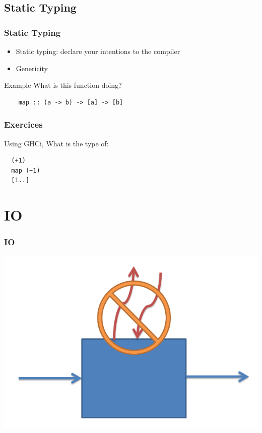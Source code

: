 \documentclass{beamer}
\begin{document}
\subsection{Static Typing}
\begin{frame}[fragile]
\frametitle{Static Typing}

 \begin{itemize}
  \item Static typing: declare your intentions to the compiler
  \item Genericity
 \end{itemize}
 
 \begin{block}{Example}
  What is this function doing?
  \begin{lstlisting}
    map :: (a -> b) -> [a] -> [b]
  \end{lstlisting}
 \end{block}

\end{frame}

\begin{frame}[fragile]
\frametitle{Exercices}

 Using GHCi, What is the type of:
 \begin{lstlisting}
  (+1)
  map (+1)
  [1..]
 \end{lstlisting}
 
\end{frame}

\section{IO}
\begin{frame}
\frametitle{IO}

  \includegraphics[width=1\linewidth]{figs/noIO}

\end{frame}
\end{document}
